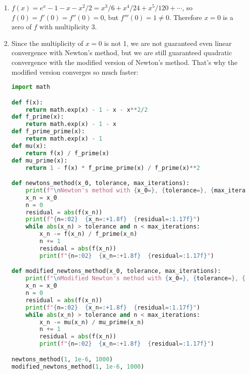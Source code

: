 \documentclass{article}
\begin{document}
\bigskip
\begin{prob}
\end{prob}
\begin{enumerate}[label=(\alph*)]
    \item $f(x) = e^x - 1 - x - x^2/2 = x^3/6 + x^4/24 + x^5/120 + \cdots$, so $f(0)=f'(0)=f''(0)=0$, but $f'''(0)=1\neq 0$. Therefore $x=0$ is a zero of $f$ with multiplicity 3.
    \item Since the multiplicity of $x=0$ is not 1, we are not guaranteed even linear convergence with Newton's method, but we are still guaranteed quadratic convergence with the modified version of Newton's method. That's why the modified version converges so much faster:

\begin{lstlisting}[language=Python]
import math

def f(x):
    return math.exp(x) - 1 - x - x**2/2
def f_prime(x):
    return math.exp(x) - 1 - x
def f_prime_prime(x):
    return math.exp(x) - 1
def mu(x):
    return f(x) / f_prime(x)
def mu_prime(x):
    return 1 - f(x) * f_prime_prime(x) / f_prime(x)**2

def newtons_method(x_0, tolerance, max_iterations):
    print(f"\nNewton's method with {x_0=}, {tolerance=}, {max_iterations=}")
    x_n = x_0
    n = 0
    residual = abs(f(x_n))
    print(f"{n=:02}  {x_n=:+1.8f}  {residual=:1.17f}")
    while abs(x_n) > tolerance and n < max_iterations:
        x_n -= f(x_n) / f_prime(x_n)
        n += 1
        residual = abs(f(x_n))
        print(f"{n=:02}  {x_n=:+1.8f}  {residual=:1.17f}")

def modified_newtons_method(x_0, tolerance, max_iterations):
    print(f"\nModified Newton's method with {x_0=}, {tolerance=}, {max_iterations=}")
    x_n = x_0
    n = 0
    residual = abs(f(x_n))
    print(f"{n=:02}  {x_n=:+1.8f}  {residual=:1.17f}")
    while abs(x_n) > tolerance and n < max_iterations:
        x_n -= mu(x_n) / mu_prime(x_n)
        n += 1
        residual = abs(f(x_n))
        print(f"{n=:02}  {x_n=:+1.8f}  {residual=:1.17f}")

newtons_method(1, 1e-6, 1000)
modified_newtons_method(1, 1e-6, 1000)



\end{lstlisting}
\end{enumerate}
\end{document}
